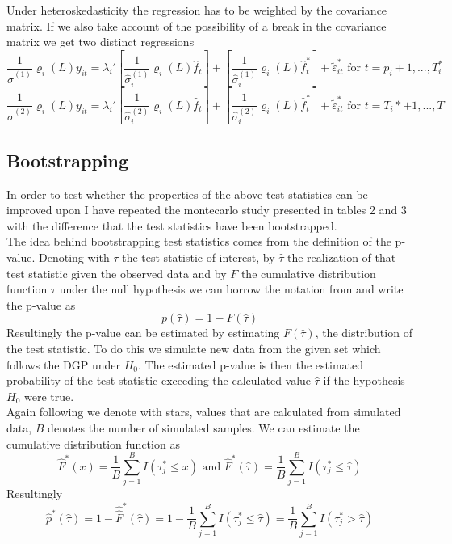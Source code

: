 \documentclass[12pt]{article}
\begin{document}
Under heteroskedasticity the regression has to be weighted by the covariance matrix. If we also take account of the possibility of a break in the covariance matrix we get two distinct regressions
$$\frac{1}{\hat \sigma^{(1)}} \varrho_i(L) y_{it} = \lambda_i' \left[\frac{1}{\hat \sigma_i^{(1)}} \varrho_i(L) \hat f_t\right] + \left[\frac{1}{\hat \sigma_i^{(1)}} \varrho_i(L) \hat f_t^*\right] + \tilde \varepsilon^*_{it} \text{ for } t = p_i+1, ..., T^*_i$$
$$\frac{1}{\hat \sigma^{(2)}} \varrho_i(L) y_{it} = \lambda_i' \left[\frac{1}{\hat \sigma_i^{(2)}} \varrho_i(L) \hat f_t\right] + \left[\frac{1}{\hat \sigma_i^{(2)}} \varrho_i(L) \hat f_t^*\right] + \tilde \varepsilon^*_{it} \text{ for } t = T_i*+1, ..., T$$



\subsection{Bootstrapping \citet{breitung2011testing}}
In order to test whether the properties of the above test statistics can be improved upon I have repeated the montecarlo study presented in \citet{breitung2011testing} tables 2 and 3 with the difference that the test statistics have been bootstrapped. \\

The idea behind bootstrapping test statistics comes from the definition of the p-value. Denoting with $\tau$ the test statistic of interest, by $\hat \tau$ the realization of that test statistic given the observed data and by $F$ the cumulative distribution function $\tau$ under the null hypothesis we can borrow the notation from \citet{davidson2004econometric} and write the p-value as
$$p(\hat \tau) = 1 - F(\hat \tau)$$
Resultingly the p-value can be estimated by estimating $F(\hat \tau)$, the distribution of the test statistic. To do this we simulate new data from the given set which follows the DGP under $H_0$. The estimated p-value is then the estimated probability of the test statistic exceeding the calculated value $\hat \tau$ if the hypothesis $H_0$ were true. \\

Again following \citet{davidson2004econometric} we denote with stars, values that are calculated from simulated data, $B$ denotes the number of simulated samples. We can estimate the cumulative distribution function as 
$$\hat F^*(x) = \frac{1}{B} \sum_{j=1}^B I(\tau^*_j \leq x) \text{ and } \hat F^*(\hat \tau) = \frac{1}{B} \sum_{j=1}^B I(\tau^*_j \leq \hat \tau)$$
Resultingly
$$\hat p^*(\hat \tau) = 1 - \hat \hat F^*(\hat \tau) = 1 - \frac{1}{B} \sum_{j=1}^B I (\tau^*_j \leq \hat \tau) = \frac{1}{B}\sum_{j=1}^B I(\tau^*_j > \hat \tau)$$
\end{document}
